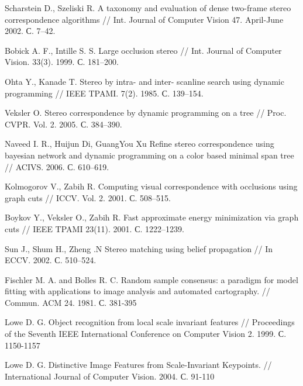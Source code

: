 
\begin{thebibliography}{1}
	Scharstein D., Szeliski R. A taxonomy and evaluation of dense
	two-frame stereo correspondence algorithms // Int. Journal of
	Computer Vision 47. April-June 2002. С. 7–42.
	
	Bobick A. F., Intille S. S. Large occlusion stereo // Int. Journal
	of Computer Vision. 33(3). 1999. С. 181–200.
	
	Ohta Y., Kanade T. Stereo by intra- and inter- scanline search
	using dynamic programming // IEEE TPAMI. 7(2). 1985.
	С. 139–154.
	
	Veksler O. Stereo correspondence by dynamic programming on a
	tree // Proc. CVPR. Vol. 2. 2005. С. 384–390.
	
	Naveed I. R., Huijun Di, GuangYou Xu Refine stereo
	correspondence using bayesian network and dynamic programming
	on a color based minimal span tree // ACIVS. 2006. С. 610–619.
	
	Kolmogorov V., Zabih R. Computing visual correspondence with
	occlusions using graph cuts // ICCV. Vol. 2. 2001. С. 508–515.
	
	Boykov Y., Veksler O., Zabih R. Fast approximate energy
	minimization via graph cuts // IEEE TPAMI 23(11). 2001.
	С. 1222–1239.
	
	Sun J., Shum H., Zheng .N Stereo matching using belief
	propagation // In ECCV. 2002. С. 510–524.
	
	
	Fischler M. A. and Bolles R. C. Random sample consensus: a paradigm for model fitting with applications to image analysis and automated cartography. // Commun. ACM 24. 1981. С. 381-395
	
	Lowe D. G. Object recognition from local scale invariant features // Proceedings of the Seventh IEEE International Conference on Computer Vision 2. 1999. С. 1150-1157
	
	Lowe D. G. Distinctive Image Features from Scale-Invariant Keypoints. // International Journal of Computer Vision. 2004. С. 91-110
\end{thebibliography}
